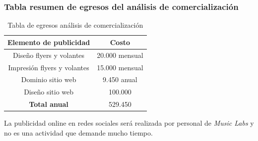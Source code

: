 \subsubsection{Tabla resumen de egresos del análisis de comercialización}		
\vspace{0.5cm}
\begin{table}[h!]
\centering
	\begin{tabular}{|c|c|}
	\hline
	Elemento de publicidad          & Costo          \\ \hline
	Diseño flyers y volantes        & 20.000 mensual \\ 
	Impresión flyers y volantes     & 15.000 mensual \\ 
	Dominio sitio web               & 9.450 anual    \\ 
	Diseño sitio web                & 100.000        \\ \hline
	{\bf Total anual}               & 529.450        \\ \hline
	\end{tabular}
\caption{Tabla de egresos análisis de comercialización}
\end{table}


La publicidad online en redes sociales será realizada por personal de \emph{Music Labs} y no es una actividad que demande mucho tiempo.


